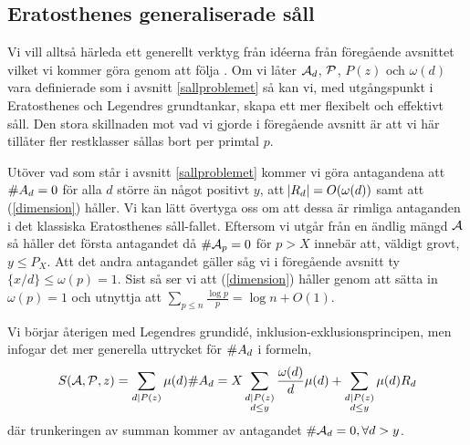 \subsection{Eratosthenes generaliserade såll} \label{eratosthenes.gen.såll}
Vi vill alltså härleda ett generellt verktyg från idéerna från föregående avsnittet vilket vi kommer göra genom att följa \cite[Kap. 5.4]{cojocarumurty}. Om vi låter $\A_d$, $\P$, $P(z)$ och $\omega(d)$ vara definierade som i avsnitt \ref{sallproblemet} så kan vi, med utgångspunkt i Eratosthenes och Legendres grundtankar, skapa ett mer flexibelt och effektivt såll. Den stora skillnaden mot vad vi gjorde i föregående avsnitt är att vi här tillåter fler restklasser sållas bort per primtal $p$. 

Utöver vad som står i avsnitt \ref{sallproblemet} kommer vi göra antagandena att \(\card{A_d} = 0\) för alla \(d\) större än något positivt $y$, att \(\abs{R_d} = O(\omega(d))\) samt att (\ref{dimension}) håller. Vi kan lätt övertyga oss om att dessa är rimliga antaganden i det klassiska Eratosthenes såll-fallet. Eftersom vi utgår från en ändlig mängd $\A$ så håller det första antagandet då \(\card{\A_p} = 0\) för \(p > X\) innebär att, väldigt grovt, \(y \leq P_{X}\). Att det andra antagandet gäller såg vi i föregående avsnitt ty \(\{x/d\} \leq \omega(p) = 1\). Sist så ser vi att (\ref{dimension}) håller genom att sätta in \(\omega(p) = 1\) och utnyttja att \(\sum_{p\leq n}\frac{\log p}{p} = \log n + O(1)\).

Vi börjar återigen med Legendres grundidé, inklusion-exklusionsprincipen, men infogar det mer generella uttrycket för $\card{A_d}$ i formeln,
\begin{align*}
    \S{A}{P}{z} = \sum_{d \divides P(z)} \mu(d) \card{A_d} = X \sum_{\substack{d \divides P(z) \\ d \leq y}} \frac{\omega(d)}{d} \mu(d) + \sum_{\substack{d \divides P(z)  \\ d \leq y}} \mu(d) R_d 
\end{align*}
där trunkeringen av summan kommer av antagandet \(\card{\A_d} = 0, \forall d > y\). 

